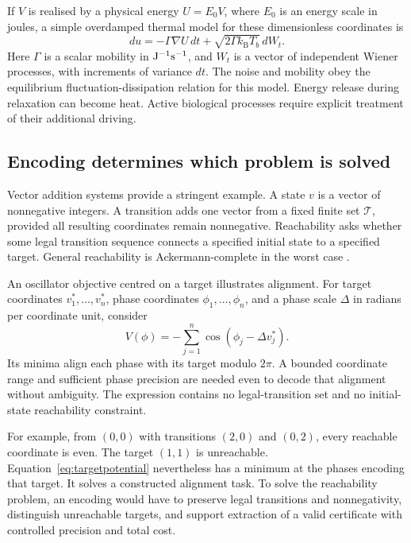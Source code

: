 \documentclass[11pt,a4paper]{article}
\begin{document}
If \(V\) is realised by a physical energy \(U=E_0V\), where \(E_0\) is an energy scale in joules, a simple overdamped thermal model for these dimensionless coordinates is
\begin{equation}
 du=-\Gamma\nabla U\,dt+\sqrt{2\Gamma k_{\mathrm B}T_b}\,dW_t.
 \label{eq:langevin}
\end{equation}
Here \(\Gamma\) is a scalar mobility in \({\rm J}^{-1}{\rm s}^{-1}\), and \(W_t\) is a vector of independent Wiener processes, with increments of variance \(dt\). The noise and mobility obey the equilibrium fluctuation-dissipation relation for this model. Energy release during relaxation can become heat. Active biological processes require explicit treatment of their additional driving.

\subsection{Encoding determines which problem is solved}

Vector addition systems provide a stringent example. A state \(v\) is a vector of nonnegative integers. A transition adds one vector from a fixed finite set \(\mathcal T\), provided all resulting coordinates remain nonnegative. Reachability asks whether some legal transition sequence connects a specified initial state to a specified target. General reachability is Ackermann-complete in the worst case \citep{czerwinski2021}.

An oscillator objective centred on a target illustrates alignment. For target coordinates \(v_1^\ast,\ldots,v_n^\ast\), phase coordinates \(\phi_1,\ldots,\phi_n\), and a phase scale \(\Delta\) in radians per coordinate unit, consider
\begin{equation}
 V(\phi)=-\sum_{j=1}^{n}\cos(\phi_j-\Delta v_j^\ast).
 \label{eq:targetpotential}
\end{equation}
Its minima align each phase with its target modulo \(2\pi\). A bounded coordinate range and sufficient phase precision are needed even to decode that alignment without ambiguity. The expression contains no legal-transition set and no initial-state reachability constraint.

For example, from \((0,0)\) with transitions \((2,0)\) and \((0,2)\), every reachable coordinate is even. The target \((1,1)\) is unreachable. Equation~\eqref{eq:targetpotential} nevertheless has a minimum at the phases encoding that target. It solves a constructed alignment task. To solve the reachability problem, an encoding would have to preserve legal transitions and nonnegativity, distinguish unreachable targets, and support extraction of a valid certificate with controlled precision and total cost.
\end{document}
